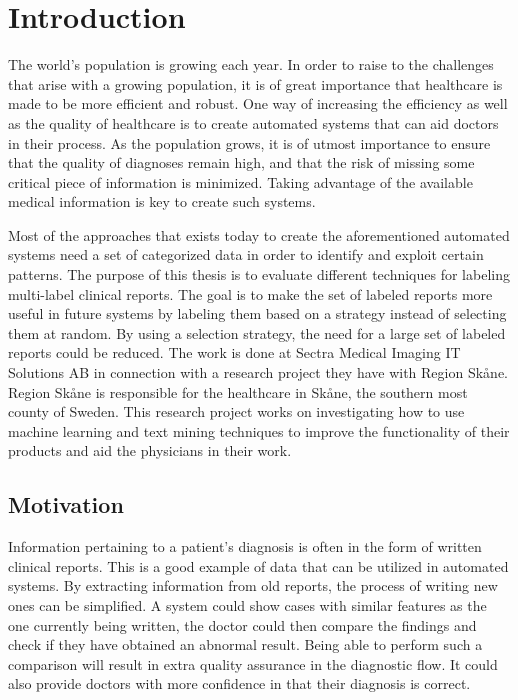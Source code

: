 \chapter{Introduction}
\label{cha:introduction}

The world's population is growing each year. 
In order to raise to the challenges that arise with a growing population, it is of great importance that healthcare is made to be more efficient and robust.
One way of increasing the efficiency as well as the quality of healthcare is to create automated systems that can aid doctors in their process.
As the population grows, it is of utmost importance to ensure that the quality of diagnoses remain high, and that the risk of missing some critical piece of information is minimized.
Taking advantage of the available medical information is key to create such systems.

Most of the approaches that exists today to create the aforementioned automated systems need a set of categorized data in order to identify and exploit certain patterns.
The purpose of this thesis is to evaluate different techniques for labeling multi-label clinical reports.
The goal is to make the set of labeled reports more useful in future systems by labeling them based on a strategy instead of selecting them at random.
By using a selection strategy, the need for a large set of labeled reports could be reduced.
The work is done at Sectra Medical Imaging IT Solutions AB in connection with a research project they have with Region Skåne.
Region Skåne is responsible for the healthcare in Skåne, the southern most county of Sweden.
This research project works on investigating how to use machine learning and text mining techniques to improve the functionality of their products and aid the physicians in their work.

\section{Motivation}
\label{sec:motivation}

Information pertaining to a patient's diagnosis is often in the form of written clinical reports.
This is a good example of data that can be utilized in automated systems.
By extracting information from old reports, the process of writing new ones can be simplified.
A system could show cases with similar features as the one currently being written, the doctor could then compare the findings and check if they have obtained an abnormal result.
Being able to perform such a comparison will result in extra quality assurance in the diagnostic flow.
It could also provide doctors with more confidence in that their diagnosis is correct.


